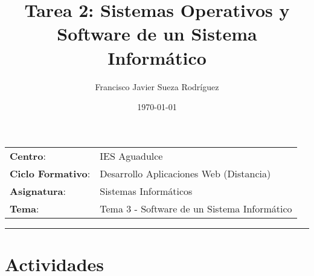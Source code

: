 


\title{
\vspace{10ex}
\normalfont \normalsize
\Huge \textbf{Tarea 2: Sistemas Operativos y Software de un Sistema Informático}
}
\author{Francisco Javier Sueza Rodríguez}
\date{\normalsize\today}



\maketitle

\thispagestyle{empty}

\vspace{68ex}

\begin{center}
    \begin{tabular}{l l}
        \textbf{Centro}: & IES Aguadulce \\
        \textbf{Ciclo Formativo}: & Desarrollo Aplicaciones Web (Distancia)\\
        \textbf{Asignatura}: & Sistemas Informáticos\\
        \textbf{Tema}: & Tema 3 -  Software de un Sistema Informático\\
    \end{tabular}
\end{center}

\newpage

\tableofcontents

\vspace{15ex}

\hrule

\vspace{10ex}

\listoffigures

\newpage

\section{Actividades}


\newpage



